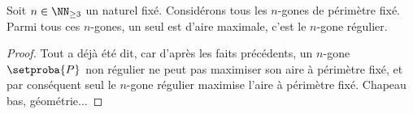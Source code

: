 

\begin{fact}
	Soit $n \in \NN_{\geq3}$ un naturel fixé.
	Considérons tous les $n$-gones de périmètre fixé. Parmi tous ces $n$-gones, un seul est d'aire maximale, c'est le $n$-gone régulier.
\end{fact}


\begin{proof}
	Tout a déjà été dit, car d'après les faits précédents, un $n$-gone $\setproba{P}$ non régulier ne peut pas maximiser son aire à périmètre fixé, et par conséquent seul le $n$-gone régulier maximise l'aire à périmètre fixé. Chapeau bas, géométrie...
\end{proof}
